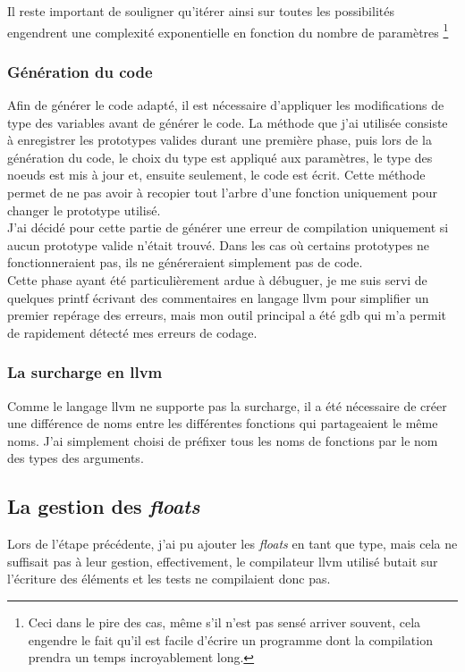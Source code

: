 \documentclass[12pt]{article}
\begin{document}
Il reste important de souligner qu'itérer ainsi sur toutes les possibilités
engendrent une complexité exponentielle en fonction du nombre de paramètres
\footnote{Ceci dans le pire des cas, même s'il n'est pas sensé arriver
souvent, cela engendre le fait qu'il est facile d'écrire un programme dont
la compilation prendra un temps incroyablement long.}

\subsubsection{Génération du code}
Afin de générer le code adapté, il est nécessaire d'appliquer les
modifications de type des variables avant de générer le code. La méthode
que j'ai utilisée consiste à enregistrer les prototypes valides durant une
première phase, puis lors de la génération du code, le choix du type est
appliqué aux paramètres, le type des noeuds est mis à jour et, ensuite
seulement, le code est écrit. Cette méthode permet de ne pas avoir à recopier
tout l'arbre d'une fonction uniquement pour changer le prototype utilisé.\\

J'ai décidé pour cette partie de générer une erreur de compilation uniquement
si aucun prototype valide n'était trouvé. Dans les cas où certains prototypes
ne fonctionneraient pas, ils ne généreraient simplement pas de code.\\

Cette phase ayant été particulièrement ardue à débuguer, je me suis servi de
quelques printf écrivant des commentaires en langage llvm pour simplifier
un premier repérage des erreurs, mais mon outil principal a été gdb qui m'a
permit de rapidement détecté mes erreurs de codage.

\subsubsection{La surcharge en llvm}
Comme le langage llvm ne supporte pas la surcharge, il a été nécessaire de
créer une différence de noms entre les différentes fonctions qui partageaient
le même noms. J'ai simplement choisi de préfixer tous les noms de fonctions
par le nom des types des arguments.

\subsection{La gestion des {\em floats}}
Lors de l'étape précédente, j'ai pu ajouter les {\em floats} en tant que
type, mais cela ne suffisait pas à leur gestion, effectivement, le
compilateur llvm utilisé butait sur l'écriture des éléments et les tests ne
compilaient donc pas.\\
\end{document}
